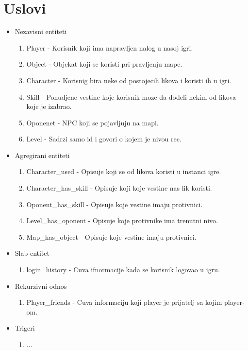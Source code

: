 \documentclass{article}
\begin{document}
\section {Uslovi}

\begin{itemize}
\item Nezavisni entiteti
	\begin{enumerate}
	\item Player - Korisnik koji ima napravljen nalog u nasoj igri.
	\item Object - Objekat koji se koristi pri pravljenju mape.
	\item Character - Korisnig bira neke od postojecih likova i koristi ih u igri.
	\item Skill - Ponudjene vestine koje korisnik moze da dodeli nekim od likova koje je izabrao.
	\item Oponenet - NPC koji se pojavljuju na mapi.
	\item Level - Sadrzi samo id i govori o kojem je nivou rec.
	\end{enumerate}

\item Agregirani entiteti
	\begin{enumerate}
	\item Character\_used - Opisuje koji se od likova koristi u instanci igre.
	\item Character\_has\_skill - Opisuje koji koje vestine nas lik koristi.
	\item Oponent\_has\_skill - Opisuje koje vestine imaju protivnici.
	\item Level\_has\_oponent - Opisuje koje protivnike ima trenutni nivo.
	\item Map\_has\_object - Opisuje koje vestine imaju protivnici.

	\end{enumerate}

\item Slab entitet
	\begin{enumerate}
	\item login\_history - Cuva ifnormacije kada se korisnik logovao u igru.
	\end{enumerate}

\item Rekurzivni odnos
	\begin{enumerate}
	\item Player\_friends - Cuva informaciju koji player je prijatelj sa kojim player-om.
	\end{enumerate}

\item Trigeri
	\begin{enumerate}
	\item ...
	\end{enumerate}

\end{itemize}
\end{document}
